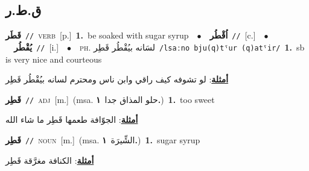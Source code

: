 \documentclass[10pt,a4paper,twoside]{article} %
\begin{document}
\begin{multicols}{2}
\vspace{-3mm}
\subsection*{\color{blue}\foreignlanguage{arabic}{ق.ط.ر}\color{blue}{}} 

{\setlength\topsep{0pt}\textbf{\foreignlanguage{arabic}{قَطَر}}\ {\color{gray}\texttt{//}\color{black}}\ \textsc{verb}\ [p.]\ \textbf{1.}~be soaked with sugar syrup\ \ $\bullet$\ \ \setlength\topsep{0pt}\textbf{\foreignlanguage{arabic}{اُقْطُر}}\ {\color{gray}\texttt{//}\color{black}}\ [c.]\ \ $\bullet$\ \ \setlength\topsep{0pt}\textbf{\foreignlanguage{arabic}{يُقْطُر}}\ {\color{gray}\texttt{//}\color{black}}\ [i.]\ \ $\bullet$\ \ \textsc{ph.} \color{gray} \foreignlanguage{arabic}{لسَانه بيُقْطُر قَطِر}\color{black}\ {\color{gray}\texttt{/{\sffamily lsaːno bju(q)tˤur (q)atˤir}/}\color{black}}\ \textbf{1.}~sb is very nice and courteous\  \begin{flushright}\color{gray}\foreignlanguage{arabic}{\textbf{\underline{\foreignlanguage{arabic}{أمثلة}}}: لو تشوفه كيف راقي وابن ناس ومحترم لسانه بيُقْطُر قَطِر}\end{flushright}\color{black}} \vspace{2mm}

{\setlength\topsep{0pt}\textbf{\foreignlanguage{arabic}{قَطِر}}\ {\color{gray}\texttt{//}\color{black}}\ \textsc{adj}\ [m.]\ \color{gray}(msa. \foreignlanguage{arabic}{حلو المذاق جدا}~\foreignlanguage{arabic}{\textbf{١.}})\color{black}\ \textbf{1.}~too sweet\  \begin{flushright}\color{gray}\foreignlanguage{arabic}{\textbf{\underline{\foreignlanguage{arabic}{أمثلة}}}: الجوّافة طعمها قَطِر ما شاء الله}\end{flushright}\color{black}} \vspace{2mm}

{\setlength\topsep{0pt}\textbf{\foreignlanguage{arabic}{قَطِر}}\ {\color{gray}\texttt{//}\color{black}}\ \textsc{noun}\ [m.]\ \color{gray}(msa. \foreignlanguage{arabic}{الشِّيرَة}~\foreignlanguage{arabic}{\textbf{١.}})\color{black}\ \textbf{1.}~sugar syrup\  \begin{flushright}\color{gray}\foreignlanguage{arabic}{\textbf{\underline{\foreignlanguage{arabic}{أمثلة}}}: الكنافة مغرَّقة قَطِر}\end{flushright}\color{black}} \vspace{2mm}


\end{multicols}
\end{document}
